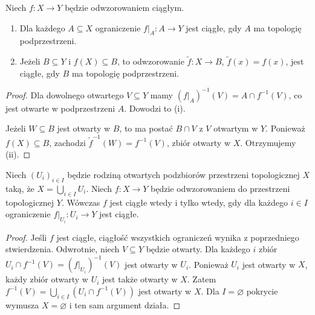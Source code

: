 \begin{stwierdzenie}
\label{prop:topog-ograniczanie-ciaglosci}
Niech $f\colon X\to Y$ będzie odwzorowaniem ciągłym.
\begin{enumerate}[label=(\roman*)]
\item Dla każdego $A\subseteq X$ ograniczenie
      $f|_A\colon A\to Y$ jest ciągłe, gdy $A$
      ma topologię podprzestrzeni.
\item Jeżeli $B\subseteq Y$ i $f(X)\subseteq B$,
      to odwzorowanie $\widetilde f\colon X\to B$,
      $\widetilde f(x)=f(x)$, jest ciągłe,
      gdy $B$ ma topologię podprzestrzeni.
\end{enumerate}
\end{stwierdzenie}
\begin{proof}
Dla dowolnego otwartego $V\subseteq Y$ mamy
$(f|_A)^{-1}(V)=A\cap f^{-1}(V)$, co jest otwarte
w podprzestrzeni $A$. Dowodzi to (i).

Jeżeli $W\subseteq B$ jest otwarty w $B$,
to ma postać $B\cap V$ z $V$ otwartym w $Y$.
Ponieważ $f(X)\subseteq B$, zachodzi
$\widetilde f^{-1}(W)=f^{-1}(V)$, zbiór otwarty
w $X$. Otrzymujemy (ii).
\end{proof}

\begin{twierdzenie}
\label{thm:topog-ciaglosc-lokalna-pokrycie}
Niech $(U_i)_{i\in I}$ będzie rodziną otwartych
podzbiorów przestrzeni topologicznej $X$ taką, że
$X=\bigcup_{i\in I}U_i$. Niech $f\colon X\to Y$ będzie
odwzorowaniem do przestrzeni topologicznej $Y$.
Wówczas $f$ jest ciągłe wtedy i tylko wtedy, gdy
dla każdego $i\in I$ ograniczenie
$f|_{U_i}\colon U_i\to Y$ jest ciągłe.
\end{twierdzenie}
\begin{proof}
Jeśli $f$ jest ciągłe, ciągłość wszystkich ograniczeń
wynika z poprzedniego stwierdzenia.
Odwrotnie, niech $V\subseteq Y$ będzie otwarty.
Dla każdego $i$ zbiór
$U_i\cap f^{-1}(V)=(f|_{U_i})^{-1}(V)$ jest otwarty
w $U_i$. Ponieważ $U_i$ jest otwarty w $X$,
każdy zbiór otwarty w $U_i$ jest także otwarty w $X$.
Zatem $f^{-1}(V)=\bigcup_{i\in I}(U_i\cap f^{-1}(V))$
jest otwarty w $X$. Dla $I=\varnothing$ pokrycie
wymusza $X=\varnothing$ i ten sam argument działa.
\end{proof}

